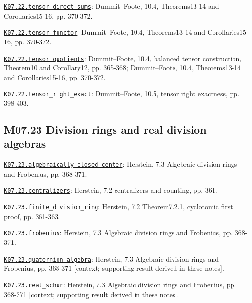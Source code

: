 \par\smallskip\noindent\hypertarget{src:K07.22.tensor_direct_sums}{}\label{src:K07.22.tensor_direct_sums}\hyperref[K07.22.tensor_direct_sums]{\texttt{K07.22.tensor\_direct\_sums}}: Dummit--Foote, 10.4, Theorems13-14 and Corollaries15-16, pp. 370-372.
\par\smallskip\noindent\hypertarget{src:K07.22.tensor_functor}{}\label{src:K07.22.tensor_functor}\hyperref[K07.22.tensor_functor]{\texttt{K07.22.tensor\_functor}}: Dummit--Foote, 10.4, Theorems13-14 and Corollaries15-16, pp. 370-372.
\par\smallskip\noindent\hypertarget{src:K07.22.tensor_quotients}{}\label{src:K07.22.tensor_quotients}\hyperref[K07.22.tensor_quotients]{\texttt{K07.22.tensor\_quotients}}: Dummit--Foote, 10.4, balanced tensor construction, Theorem10 and Corollary12, pp. 365-368; Dummit--Foote, 10.4, Theorems13-14 and Corollaries15-16, pp. 370-372.
\par\smallskip\noindent\hypertarget{src:K07.22.tensor_right_exact}{}\label{src:K07.22.tensor_right_exact}\hyperref[K07.22.tensor_right_exact]{\texttt{K07.22.tensor\_right\_exact}}: Dummit--Foote, 10.5, tensor right exactness, pp. 398-403.
\subsection*{M07.23 Division rings and real division algebras}
\par\smallskip\noindent\hypertarget{src:K07.23.algebraically_closed_center}{}\label{src:K07.23.algebraically_closed_center}\hyperref[K07.23.algebraically_closed_center]{\texttt{K07.23.algebraically\_closed\_center}}: Herstein, 7.3 Algebraic division rings and Frobenius, pp. 368-371.
\par\smallskip\noindent\hypertarget{src:K07.23.centralizers}{}\label{src:K07.23.centralizers}\hyperref[K07.23.centralizers]{\texttt{K07.23.centralizers}}: Herstein, 7.2 centralizers and counting, pp. 361.
\par\smallskip\noindent\hypertarget{src:K07.23.finite_division_ring}{}\label{src:K07.23.finite_division_ring}\hyperref[K07.23.finite_division_ring]{\texttt{K07.23.finite\_division\_ring}}: Herstein, 7.2 Theorem7.2.1, cyclotomic first proof, pp. 361-363.
\par\smallskip\noindent\hypertarget{src:K07.23.frobenius}{}\label{src:K07.23.frobenius}\hyperref[K07.23.frobenius]{\texttt{K07.23.frobenius}}: Herstein, 7.3 Algebraic division rings and Frobenius, pp. 368-371.
\par\smallskip\noindent\hypertarget{src:K07.23.quaternion_algebra}{}\label{src:K07.23.quaternion_algebra}\hyperref[K07.23.quaternion_algebra]{\texttt{K07.23.quaternion\_algebra}}: Herstein, 7.3 Algebraic division rings and Frobenius, pp. 368-371 [context; supporting result derived in these notes].
\par\smallskip\noindent\hypertarget{src:K07.23.real_schur}{}\label{src:K07.23.real_schur}\hyperref[K07.23.real_schur]{\texttt{K07.23.real\_schur}}: Herstein, 7.3 Algebraic division rings and Frobenius, pp. 368-371 [context; supporting result derived in these notes].

